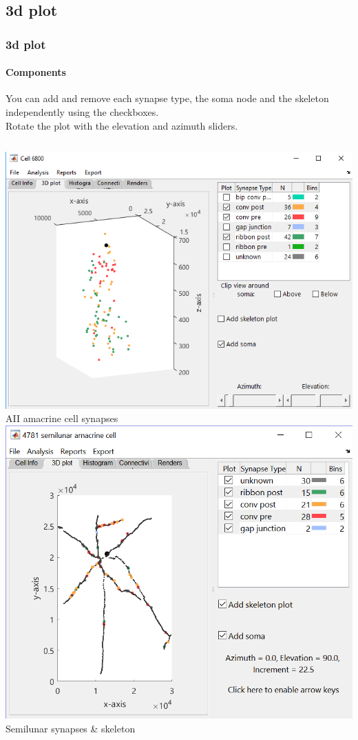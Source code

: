 \documentclass[11pt]{beamer}
\begin{document}
	\subsection{3d plot}
\begin{frame}
	\frametitle{3d plot}
	\framesubtitle{Components}
		You can add and remove each synapse type, the soma node and the skeleton independently using the checkboxes.\\Rotate the plot with the elevation and azimuth sliders.
		\vskip20pt
		\begin{columns}
				\includegraphics[width=\textwidth]{c6800_plot3}
				\vskip5pt
				AII amacrine cell synapses
				\includegraphics[width=\textwidth]{c4781_plot3}
				\vskip5pt
				Semilunar synapses \& skeleton
		\end{columns}
\end{frame}
\end{document}
